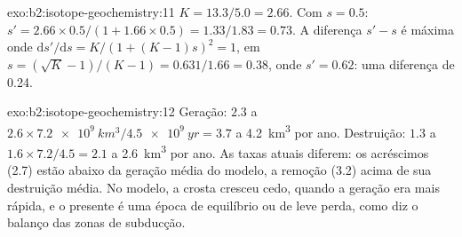 \begin{solution}{exo:b2:isotope-geochemistry:11}
$K = 13.3/5.0 = 2.66$. Com $s = 0.5$: $s' = 2.66\times0.5/(1 + 1.66\times0.5) =
1.33/1.83 = 0.73$. A diferença $s' - s$ é máxima onde
$\mathrm{d}s'/\mathrm{d}s = K/(1+(K-1)s)^2 = 1$, em $s = (\sqrt K - 1)/(K-1) =
0.631/1.66 = 0.38$, onde $s' = 0.62$: uma diferença de 0.24.
\end{solution}

\begin{solution}{exo:b2:isotope-geochemistry:12}
Geração: $2.3$ a $2.6\times\qty{7.2e9}{km^3}/\qty{4.5e9}{yr} = 3.7$ a
\qty{4.2}{km^3} por ano. Destruição: $1.3$ a $1.6\times7.2/4.5 = 2.1$ a
\qty{2.6}{km^3} por ano. As taxas atuais diferem: os acréscimos (2.7) estão abaixo da
geração média do modelo, a remoção (3.2) acima de sua destruição média. No modelo, a crosta cresceu
cedo, quando a geração era mais rápida, e o presente é uma época de equilíbrio ou de leve
perda, como diz o balanço das zonas de subducção.
\end{solution}

